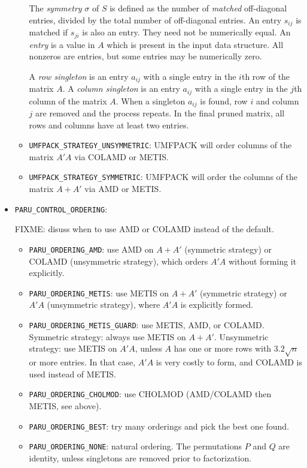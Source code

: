 \documentclass[12pt]{article}
\begin{document}
\begin{itemize}
\begin{itemize}
            The {\em symmetry} $\sigma$ of ${S}$ is defined as the number of
            {\em matched} off-diagonal entries, divided by the total number of
            off-diagonal entries.  An entry $s_{ij}$ is matched if $s_{ji}$ is
            also an entry.  They need not be numerically equal.  An {\em entry}
            is a value in $A$ which is present in the input data structure.
            All nonzeros are entries, but some entries may be numerically zero.

            A {\em row singleton} is an entry $a_{ij}$ with a single entry in
            the $i$th row of the matrix $A$.  A {\em column singleton} is an
            entry $a_{ij}$ with a single entry in the $j$th column of the
            matrix $A$.  When a singleton $a_{ij}$ is found, row $i$ and column
            $j$ are removed and the process repeats.  In the final pruned
            matrix, all rows and columns have at least two entries.

        \item \verb'UMFPACK_STRATEGY_UNSYMMETRIC': UMFPACK will order columns
            of the matrix $A'A$ via COLAMD or METIS.

        \item \verb'UMFPACK_STRATEGY_SYMMETRIC': UMFPACK will order the columns
            of the matrix $A+A'$ via AMD or METIS.

        \end{itemize}

    \item \verb'PARU_CONTROL_ORDERING': %

        FIXME: disuss when to use AMD or COLAMD instead of the default.

        \begin{itemize}
        \item \verb'PARU_ORDERING_AMD':
            use AMD on $A+A'$ (symmetric strategy) or COLAMD (unsymmetric
            strategy), which orders $A'A$ without forming it explicitly.
        \item \verb'PARU_ORDERING_METIS': use METIS on $A+A'$ (symmetric
            strategy) or $A'A$ (unsymmetric strategy), where $A'A$ is
            explicitly formed.
        \item \verb'PARU_ORDERING_METIS_GUARD':
            use METIS, AMD, or COLAMD.  Symmetric strategy: always use METIS on
            $A+A'$.  Unsymmetric strategy: use METIS on $A'A$, unless $A$ has
            one or more rows with $3.2\sqrt{n}$ or more entries.  In that case,
            $A'A$ is very costly to form, and COLAMD is used instead of METIS.
        \item \verb'PARU_ORDERING_CHOLMOD':
            use CHOLMOD (AMD/COLAMD then METIS, see above).
        \item \verb'PARU_ORDERING_BEST':
            try many orderings and pick the best one found.
        \item \verb'PARU_ORDERING_NONE':
            natural ordering.  The permutations $P$ and $Q$ are identity,
            unless singletons are removed prior to factorization.
        \end{itemize}


\end{itemize}
\end{document}

